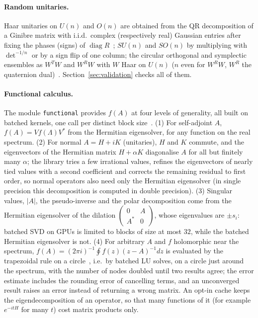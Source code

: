 \documentclass[11pt]{article}
\begin{document}
\paragraph{Random unitaries.} Haar unitaries on $U(n)$ and $O(n)$ are obtained from the QR decomposition
of a Ginibre matrix with i.i.d.\ complex (respectively real) Gaussian entries after fixing the phases (signs) of
$\operatorname{diag}R$~\cite{mezzadri2007}; $SU(n)$ and $SO(n)$ by multiplying with $\det^{-1/n}$ or by
a sign flip of one column; the circular orthogonal and symplectic ensembles as $W^TW$ and $W^RW$ with
$W$ Haar on $U(n)$ ($n$ even for $W^RW$, $W^R$ the quaternion dual)~\cite{mehta2004}. Section~\ref{sec:validation} checks all of them.

\paragraph{Functional calculus.} The module \texttt{functional} provides $f(A)$ at four levels of generality,
all built on batched kernels, one call per distinct block size~\cite{higham2008}. (1) For self-adjoint $A$,
$f(A)=Vf(\Lambda)V^*$ from the Hermitian eigensolver, for any function on the real spectrum. (2) For normal
$A=H+iK$ (unitaries), $H$ and $K$ commute, and the eigenvectors of the Hermitian matrix $H+\alpha K$ diagonalise $A$ for
all but finitely many $\alpha$; the library tries a few irrational values, refines the eigenvectors of nearly tied values
with a second coefficient and corrects the remaining residual to first order, so normal operators also need only
the Hermitian eigensolver (in single precision this decomposition is computed in double precision). (3) Singular values, $|A|$, the pseudo-inverse and the polar decomposition
come from the Hermitian eigensolver of the dilation $\left(\begin{smallmatrix}0&A\\A^*&0\end{smallmatrix}\right)$, whose
eigenvalues are $\pm s_i$: batched SVD on GPUs is limited to blocks of size at most $32$, while the batched Hermitian
eigensolver is not. (4) For arbitrary $A$ and $f$ holomorphic near the spectrum,
$f(A)=(2\pi i)^{-1}\oint f(z)(z-A)^{-1}dz$ is evaluated by the trapezoidal rule on a circle~\cite{trefethen2014},
i.e.\ by batched LU solves, on a circle just around the spectrum, with the number of nodes doubled until two
results agree; the error estimate includes the rounding error of cancelling terms, and an unconverged result raises
an error instead of returning a wrong matrix. An opt-in cache keeps the
eigendecomposition of an operator, so that many functions of it (for example $e^{-itH}$ for many $t$) cost matrix
products only.
\end{document}
